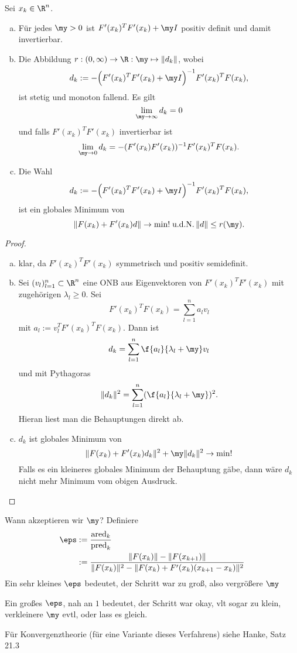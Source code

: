 \begin{lem} \label{2.61}
	Sei $x_k \in \R^n$.
	\begin{enumerate}[(a)]
		\item
			Für jedes $\my > 0$ ist $F'(x_k)^T F'(x_k) + \my I$ positiv definit und damit invertierbar.
		\item
			Die Abbildung $r: (0,\infty) \to \R: \my \mapsto \|d_k\|$, wobei
			\[
				d_k := -\Big( F'(x_k)^T F'(x_k) + \my I \Big)^{-1} F'(x_k)^T F(x_k),
			\]
			ist stetig und monoton fallend.
			Es gilt
			\[
				\lim_{\my\to\infty} d_k = 0
			\]
			und falls $F'(x_k)^T F'(x_k)$ invertierbar ist
			\[
				\lim_{\my\to 0} d_k = -(F'(x_k)F'(x_k))^{-1} F'(x_k)^T F(x_k).
			\]
		\item
			Die Wahl
			\[
				d_k := -\Big( F'(x_k)^T F'(x_k) + \my I \Big)^{-1} F'(x_k)^T F(x_k),
			\]
			ist ein globales Minimum von
			\[
				\| F(x_k) + F'(x_k) d \| \to \min!
				\udN
				\|d\| \le r(\my).
			\]
	\end{enumerate}
	\begin{proof}
		\begin{enumerate}[(a)]
			\item
				klar, da $F'(x_k)^T F'(x_k)$ symmetrisch und positiv semidefinit.
			\item
				Sei $(v_l)_{l=1}^n \subset \R^n$ eine ONB aus Eigenvektoren von $F'(x_k)^T F'(x_k)$ mit zugehörigen $\lambda_l \ge 0$.
				Sei
				\[
					F'(x_k)^T F(x_k)
					= \sum_{l=1}^n a_l v_l
				\]
				mit $a_l := v_l^T F'(x_k)^T F(x_k)$.
				Dann ist
				\[
					d_k = \sum_{l=1}^n \f {a_l}{\lambda_l + \my} v_l
				\]
				und mit Pythagoras
				\[
					\|d_k\|^2 = \sum_{l=1}^n ( \f {a_l}{\lambda_l + \my} )^2.
				\]
				Hieran liest man die Behauptungen direkt ab.
			\item
				$d_k$ ist globales Minimum von
				\[
					\| F(x_k) + F'(x_k) d_k \|^2 + \my \|d_k\|^2 \to \min!
				\]
				Falls es ein kleineres globales Minimum der Behauptung gäbe, dann wäre $d_k$ nicht mehr Minimum vom obigen Ausdruck.
		\end{enumerate}
	\end{proof}
\end{lem}

Wann akzeptieren wir $\my$?
Definiere
\begin{align*}
	\eps
	&:= \dfrac {\mathrm{ared}_k}{\mathrm{pred}_k} \\
	&:= \dfrac {\|F(x_k)\| - \|F(x_{k+1})\|}{\|F(x_k)\|^2 - \|F(x_k) + F'(x_k) (x_{k+1} - x_k)\|^2}
\end{align*}
Ein sehr kleines $\eps$ bedeutet, der Schritt war zu groß, also vergrößere $\my$

Ein großes $\eps$, nah an $1$ bedeutet, der Schritt war okay, vlt sogar zu klein, verkleinere $\my$ evtl, oder lass es gleich.

\begin{alg} \label{alg:10}
\end{alg}

Für Konvergenztheorie (für eine Variante dieses Verfahrens) siehe Hanke, Satz 21.3 %
